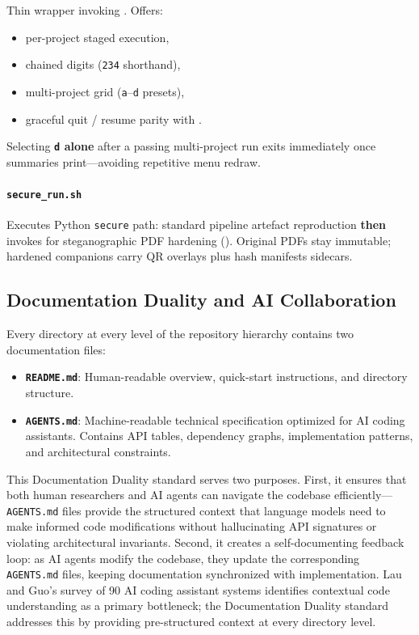 \documentclass[
  english,
]{article}
\providecommand{\tightlist}{%
  \setlength{\itemsep}{0pt}\setlength{\parskip}{0pt}}
\begin{document}
Thin wrapper invoking .
Offers:

\begin{itemize}
\tightlist
\item
  per-project staged execution,
\item
  chained digits (\texttt{234} shorthand),
\item
  multi-project grid (\texttt{a}--\texttt{d} presets),
\item
  graceful quit / resume parity with .
\end{itemize}

Selecting \textbf{\texttt{d} alone} after a passing multi-project run
exits immediately once summaries print---avoiding repetitive menu
redraw.

\paragraph{\texorpdfstring{\texttt{secure\_run.sh}}{secure_run.sh}}\label{secure_run.sh}

Executes Python \texttt{secure} path: standard pipeline artefact
reproduction \textbf{then} invokes  for
steganographic PDF hardening ().
Original PDFs stay immutable; hardened companions carry QR overlays plus
hash manifests sidecars.

\newpage

\subsection{Documentation Duality and AI
Collaboration}\label{documentation-duality-and-ai-collaboration}

Every directory at every level of the repository hierarchy contains two
documentation files:

\begin{itemize}
\tightlist
\item
  \textbf{\texttt{README.md}}: Human-readable overview, quick-start
  instructions, and directory structure.
\item
  \textbf{\texttt{AGENTS.md}}: Machine-readable technical specification
  optimized for AI coding assistants. Contains API tables, dependency
  graphs, implementation patterns, and architectural constraints.
\end{itemize}

This Documentation Duality standard serves two purposes. First, it
ensures that both human researchers and AI agents can navigate the
codebase efficiently---\texttt{AGENTS.md} files provide the structured
context that language models need to make informed code modifications
without hallucinating API signatures or violating architectural
invariants. Second, it creates a self-documenting feedback loop: as AI
agents modify the codebase, they update the corresponding
\texttt{AGENTS.md} files, keeping documentation synchronized with
implementation. Lau and Guo's survey of 90 AI coding assistant systems
\citep{lau2025aicoding} identifies contextual code understanding as a
primary bottleneck; the Documentation Duality standard addresses this by
providing pre-structured context at every directory level.
\end{document}
